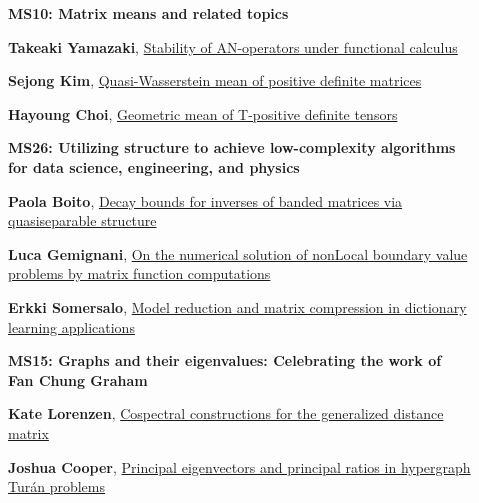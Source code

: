 \documentclass[ILAS2025-program.tex]{subfiles}
\begin{document}
\begin{description}
\begin{description}
        \end{description}
    \begin{description}
    \item[] {\color{mstitle}\textbf{MS10: Matrix means and related topics}} 
    \item[] \hypertarget{up0022}{}\textbf{Takeaki Yamazaki}, \hyperlink{down0022}{Stability of AN-operators under functional calculus}
        \item[] \hypertarget{up0023}{}\textbf{Sejong Kim}, \hyperlink{down0023}{Quasi-Wasserstein mean of positive definite matrices}
        \item[] \hypertarget{up0024}{}\textbf{Hayoung Choi}, \hyperlink{down0024}{Geometric mean of T-positive definite tensors}
        \end{description}
    \begin{description}
    \item[] {\color{mstitle}\textbf{MS26: Utilizing structure to achieve low-complexity algorithms for data science, engineering, and physics}} 
    \item[] \hypertarget{up0025}{}\textbf{Paola Boito}, \hyperlink{down0025}{Decay bounds for inverses of banded matrices via quasiseparable structure}
        \item[] \hypertarget{up0026}{}\textbf{Luca Gemignani}, \hyperlink{down0026}{On the numerical solution of nonLocal boundary value problems by matrix function computations}
        \item[] \hypertarget{up0027}{}\textbf{Erkki Somersalo}, \hyperlink{down0027}{Model reduction and matrix compression in dictionary learning applications}
        \end{description}
    \begin{description}
    \item[] {\color{mstitle}\textbf{MS15: Graphs and their eigenvalues: Celebrating the work of Fan Chung Graham}} 
    \item[] \hypertarget{up0028}{}\textbf{Kate Lorenzen}, \hyperlink{down0028}{Cospectral constructions for the generalized distance matrix}
        \item[] \hypertarget{up0029}{}\textbf{Joshua Cooper}, \hyperlink{down0029}{Principal eigenvectors and principal ratios in hypergraph Tur\'{a}n problems}

\end{description}
\end{description}
\end{document}
